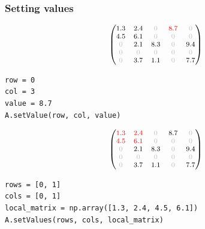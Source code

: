 \documentclass{beamer}
\begin{document}
\begin{frame}[fragile]
  \frametitle{Setting values}
$$
{\footnotesize
  \begin{pmatrix}
1.3 & 2.4 & \textcolor{lightgray}{0} & \textcolor{red}{8.7} & \textcolor{lightgray}{0} \\
4.5 & 6.1 & \textcolor{lightgray}{0} & \textcolor{lightgray}{0} & \textcolor{lightgray}{0} \\
\textcolor{lightgray}{0} & 2.1 & 8.3 & \textcolor{lightgray}{0} & 9.4 \\
\textcolor{lightgray}{0} & \textcolor{lightgray}{0} & \textcolor{lightgray}{0} & \textcolor{lightgray}{0} & \textcolor{lightgray}{0} \\
\textcolor{lightgray}{0} & 3.7 & 1.1 & \textcolor{lightgray}{0} & 7.7
\end{pmatrix}}
$$
\begin{lstlisting}
row = 0
col = 3
value = 8.7
A.setValue(row, col, value)
\end{lstlisting}
$$
\footnotesize{
\begin{pmatrix}
\textcolor{red}{1.3} & \textcolor{red}{2.4} & \textcolor{lightgray}{0} & 8.7 & \textcolor{lightgray}{0} \\
\textcolor{red}{4.5} & \textcolor{red}{6.1} & \textcolor{lightgray}{0} & \textcolor{lightgray}{0} & \textcolor{lightgray}{0} \\
\textcolor{lightgray}{0} & 2.1 & 8.3 & \textcolor{lightgray}{0} & 9.4 \\
\textcolor{lightgray}{0} & \textcolor{lightgray}{0} & \textcolor{lightgray}{0} & \textcolor{lightgray}{0} & \textcolor{lightgray}{0} \\
\textcolor{lightgray}{0} & 3.7 & 1.1 & \textcolor{lightgray}{0} & 7.7
\end{pmatrix}}
$$
\begin{lstlisting}
rows = [0, 1]
cols = [0, 1]
local_matrix = np.array([1.3, 2.4, 4.5, 6.1])
A.setValues(rows, cols, local_matrix)
\end{lstlisting}
\end{frame}

\end{document}
